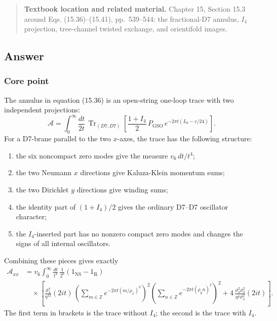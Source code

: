 \documentclass[
  10pt,
  a4paper,
  openany]{book}
\providecommand{\tightlist}{%
  \setlength{\itemsep}{0pt}\setlength{\parskip}{0pt}}
\begin{document}
\begin{quote}
\textbf{Textbook location and related material.} Chapter 15, Section
15.3 around Eqs. (15.36)--(15.41), pp.~539--544: the fractional-D7
annulus, \(I_4\) projection, tree-channel twisted exchange, and
orientifold images.
\end{quote}

\subsection{Answer}\label{answer-26}

\subsubsection{Core point}\label{core-point-26}

The annulus in equation (15.36) is an open-string one-loop trace with
two independent projections: \[
\mathcal A
=
\int_0^\infty\frac{dt}{2t}\,
\operatorname{Tr}_{(D7,D7)}
\left[
\frac{1+I_4}{2}\,
P_{\mathrm{GSO}}\,
e^{-2\pi t(L_0-c/24)}
\right].
\] For a D7-brane parallel to the two \(x\)-axes, the trace has the
following structure:

\begin{enumerate}
\def\labelenumi{\arabic{enumi}.}
\tightlist
\item
  the six noncompact zero modes give the measure \(v_6\,dt/t^4\);
\item
  the two Neumann \(x\) directions give Kaluza-Klein momentum sums;
\item
  the two Dirichlet \(y\) directions give winding sums;
\item
  the identity part of \((1+I_4)/2\) gives the ordinary D7--D7
  oscillator character;
\item
  the \(I_4\)-inserted part has no nonzero compact zero modes and
  changes the signs of all internal oscillators.
\end{enumerate}

Combining these pieces gives exactly \[
\boxed{
\begin{aligned}
\mathcal A_{xx}
&=
v_6\int_0^\infty\frac{dt}{t^4}\,
\frac{1}{2^6}
(1_{\mathrm{NS}}-1_{\mathrm R})\\
&\quad\times
\left[
\frac{\vartheta_4^4}{\eta^{12}}(2it)\,
\left(
\sum_{m\in\mathbb Z}
e^{-2\pi t(m/\rho_x)^2}
\right)^2
\left(
\sum_{n\in\mathbb Z}
e^{-2\pi t(\rho_y n)^2}
\right)^2
+
4\,
\frac{\vartheta_4^2\vartheta_3^2}
{\eta^6\vartheta_2^2}(2it)
\right].
\end{aligned}
}
\] The first term in brackets is the trace without \(I_4\); the second
is the trace with \(I_4\).
\end{document}

